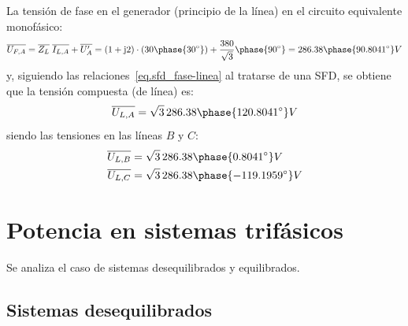 \documentclass[11pt]{book} %
\begin{document}
\begin{example}
		
		La tensión de fase en el generador (principio de la línea) en el circuito equivalente monofásico:
		\begin{equation*}
		    \overline{U_{F,A}}=\overline{Z_L}\;\overline{I_{L,A}}+ \overline{U_A'}=(1+\mathrm{j}2)\cdot(30\phase{30^\circ})+\dfrac{380}{\sqrt{3}}\phase{90^\circ}=286.38\phase{90.8041^\circ} V
		\end{equation*}
		y, siguiendo las relaciones~\eqref{eq.sfd_fase-linea} al tratarse de una SFD, se obtiene que la tensión compuesta (de línea) es: 
		\begin{equation*}
		    \overline{U_{L,A}}=\sqrt{3}\,286.38\phase{120.8041^\circ} V 
		\end{equation*}
		siendo las tensiones en las líneas $B$ y $C$:
		\begin{align*}
			  \overline{U_{L,B}}&=\sqrt{3}\,286.38\phase{0.8041^\circ} V\\
			  \overline{U_{L,C}}&=\sqrt{3}\,286.38\phase{-119.1959^\circ} V
			\end{align*}
		\end{example}
	
	\section{Potencia en sistemas trifásicos}
	
	Se analiza el caso de sistemas desequilibrados y equilibrados.
	
	\subsection{Sistemas desequilibrados}
	
\end{document}
